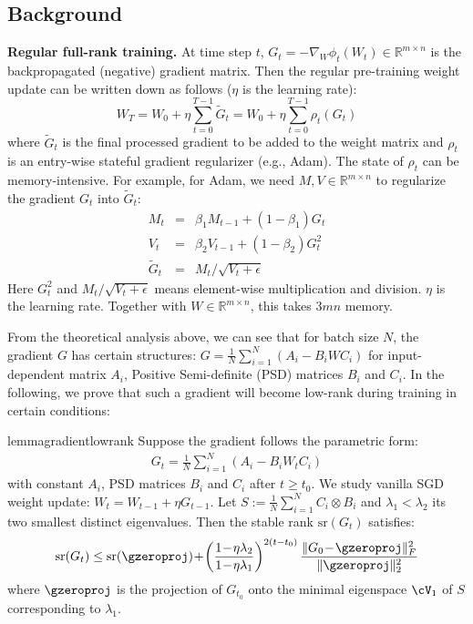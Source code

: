 \subsection{Background}

\textbf{Regular full-rank training.} At time step $t$, $G_t = -\nabla_W \phi_t(W_t) \in \mathbb{R}^{m \times n}$ is the backpropagated (negative) gradient matrix. Then the regular pre-training weight update can be written down as follows ($\eta$ is the learning rate):
\begin{equation}
    W_T = W_0 + \eta \sum_{t=0}^{T-1} \tilde G_{t} = W_0 + \eta\sum_{t=0}^{T-1} \rho_t(G_t)
\end{equation}
where $\tilde G_t$ is the final processed gradient to be added to the weight matrix and $\rho_t$ is an entry-wise stateful gradient regularizer (e.g., Adam). The state of $\rho_t$ can be memory-intensive. For example, for Adam, we need $M,V \in \mathbb{R}^{m\times n}$ to regularize the gradient $G_t$ into $\tilde G_{t}$:
\begin{eqnarray}
    M_t &=& \beta_1 M_{t-1} + (1-\beta_1) G_t \\
    V_t &=& \beta_2 V_{t-1} + (1-\beta_2) G^2_t  \\
    \tilde G_t &=& M_t / \sqrt{V_t + \epsilon}
\end{eqnarray}
Here $G_t^2$ and $M_t / \sqrt{V_t + \epsilon}$ means element-wise multiplication and division. $\eta$ is the learning rate. Together with $W\in \mathbb{R}^{m\times n}$, this takes $3mn$ memory.

From the theoretical analysis above, we can see that for batch size $N$, the gradient $G$ has certain structures: $G = \frac{1}{N}\sum_{i=1}^N (A_i - B_i W C_i)$ for input-dependent matrix $A_i$, Positive Semi-definite (PSD) matrices $B_i$ and $C_i$. In the following, we prove that such a gradient will become low-rank during training in certain conditions:

\def\sr{\mathrm{sr}}

\begin{restatable}{lemma}{gradientlowrank}
\label{lemma:gradientlowrank}
    Suppose the gradient follows the parametric form:
    \begin{eqnarray}
          G_t=\frac{1}{N}\sum_{i=1}^N (A_i-B_i W_t C_i)\label{eq:constantgradientcoeff}
    \end{eqnarray}
    with constant $A_i$, PSD matrices $B_i$ and $C_i$ after $t \ge t_0$. We study vanilla SGD weight update: $W_t=W_{t-1}+\eta G_{t-1}$. Let $S := \frac{1}{N}\sum_{i=1}^N C_i \otimes B_i$ and $\lambda_1 < \lambda_2$ its two smallest distinct eigenvalues. Then the stable rank $\sr(G_t)$ satisfies:
    \begin{equation}
        \sr(G_t) \le \sr(\gzeroproj)\!+\!\left(\frac{1\!-\!\eta \lambda_2}{1\!-\!\eta \lambda_1}\right)^{2(t-t_0)} \frac{\|G_0\!-\!\gzeroproj\|_F^2}{\|\gzeroproj\|_2^2} \label{eq:stable-rank-decay}
    \end{equation}
    where $\gzeroproj$ is the projection of $G_{t_0}$ onto the minimal eigenspace $\cV_1$ of $S$ corresponding to $\lambda_1$.
\end{restatable}

